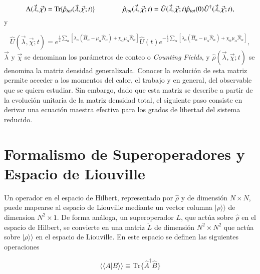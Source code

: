 \begin{equation}
    \Lambda(\vec{\lambda},\vec{\chi}) = \text{Tr}\{\hat{\rho}_{tot}(\vec{\lambda},\vec{\chi};t) \}    \hspace{14mm} \hat{\rho}_{tot}(\vec{\lambda},\vec{\chi};t) = \hat{U}(\vec{\lambda},\vec{\chi};t) \hat{\rho}_{tot}(0) \hat{U}^{\dagger}(\vec{\lambda},\vec{\chi};t),
    \label{sec2:evolucionconteo}
\end{equation}
y 

\begin{equation*}
    \hat{U}(\vec{\lambda},\vec{\chi};t) = e^{\frac{i}{2}\sum_{\alpha}[\lambda_{\alpha}(\hat{H}_{\alpha} - \mu_{\alpha}\hat{N}_{\alpha} ) + \chi_{\alpha}\mu_{\alpha}\hat{N}_{\alpha} ]  } \hat{U}(t) e^{-\frac{i}{2}\sum_{\alpha}[ \lambda_{\alpha}(\hat{H}_{\alpha} - \mu_{\alpha}\hat{N}_{\alpha}) + \chi_{\alpha}\mu_{\alpha}\hat{N}_{\alpha} ]},
\end{equation*}
$\vec{\lambda}$ y $\vec{\chi}$ se denominan los parámetros de conteo o \textit{Counting Fields}, y $\hat{\rho}(\vec{\lambda},\vec{\chi};t)$ se denomina la matriz densidad generalizada. Conocer la evolución de esta matriz permite acceder a los momentos del calor, el trabajo y en general, del observable que se quiera estudiar. Sin embargo, dado que esta matriz se describe a partir de la evolución unitaria de la matriz densidad total, el siguiente paso consiste en derivar una ecuación maestra efectiva para los grados de libertad del sistema reducido.

\label{sec2:estadistica2puntos}



\section{Formalismo de Superoperadores y Espacio de Liouville}
Un operador en el espacio de Hilbert, representado por $\hat{\rho}$ y de dimensión $N\times N$, puede mapearse al espacio de Liouville mediante  un vector columna $|\rho \rangle \rangle$ de dimension $N^{2}\times 1$. De forma análoga, un superoperador \( L \), que actúa sobre \( \hat{\rho} \) en el espacio de Hilbert, se convierte en una matriz \( \check{L} \) de dimensión \( N^2 \times N^2 \) que actúa sobre \( |\rho\rangle\rangle \) en el espacio de Liouville. En este espacio se definen las siguientes operaciones

\begin{equation*}
    \langle \langle A|B\rangle \rangle  \equiv \text{Tr}\{\hat{A}^{\dagger}\hat{B}\}
\end{equation*}

